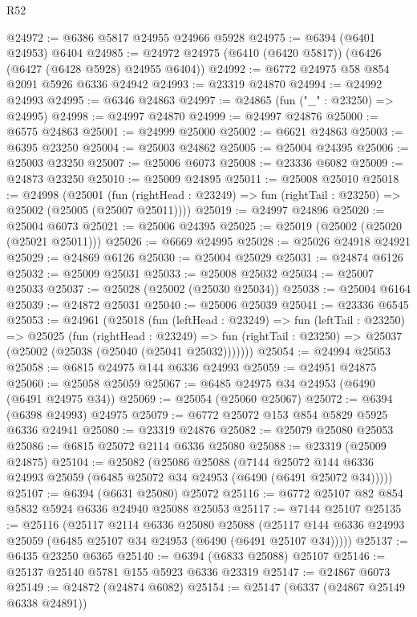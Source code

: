 \begin{lexlean}{R52}
\begin{coremodule}
@24972 := @6386 @5817 @24955 @24966 @5928
@24975 := @6394 (@6401 @24953) @6404
@24985 := @24972 @24975 (@6410 (@6420 @5817)) (@6426 (@6427 (@6428 @5928) @24955 @6404))
@24992 := @6772 @24975 @58 @854 @2091 @5926 @6336 @24942
@24993 := @23319 @24870
@24994 := @24992 @24993
@24995 := @6346 @24863
@24997 := @24865 (fun ("_" : @23250) => @24995)
@24998 := @24997 @24870
@24999 := @24997 @24876
@25000 := @6575 @24863
@25001 := @24999 @25000
@25002 := @6621 @24863
@25003 := @6395 @23250
@25004 := @25003 @24862
@25005 := @25004 @24395
@25006 := @25003 @23250
@25007 := @25006 @6073
@25008 := @23336 @6082
@25009 := @24873 @23250
@25010 := @25009 @24895
@25011 := @25008 @25010
@25018 := @24998
    (@25001
      (fun (rightHead : @23249) => fun (rightTail : @23250) => @25002 (@25005 (@25007 @25011))))
@25019 := @24997 @24896
@25020 := @25004 @6073
@25021 := @25006 @24395
@25025 := @25019 (@25002 (@25020 (@25021 @25011)))
@25026 := @6669 @24995
@25028 := @25026 @24918 @24921
@25029 := @24869 @6126
@25030 := @25004 @25029
@25031 := @24874 @6126
@25032 := @25009 @25031
@25033 := @25008 @25032
@25034 := @25007 @25033
@25037 := @25028 (@25002 (@25030 @25034))
@25038 := @25004 @6164
@25039 := @24872 @25031
@25040 := @25006 @25039
@25041 := @23336 @6545
@25053 := @24961
    (@25018
      (fun (leftHead : @23249) =>
      fun (leftTail : @23250) =>
      @25025
        (fun (rightHead : @23249) =>
        fun (rightTail : @23250) => @25037 (@25002 (@25038 (@25040 (@25041 @25032)))))))
@25054 := @24994 @25053
@25058 := @6815 @24975 @144 @6336 @24993
@25059 := @24951 @24875
@25060 := @25058 @25059
@25067 := @6485 @24975 @34 @24953 (@6490 (@6491 @24975 @34))
@25069 := @25054 (@25060 @25067)
@25072 := @6394 (@6398 @24993) @24975
@25079 := @6772 @25072 @153 @854 @5829 @5925 @6336 @24941
@25080 := @23319 @24876
@25082 := @25079 @25080 @25053
@25086 := @6815 @25072 @2114 @6336 @25080
@25088 := @23319 (@25009 @24875)
@25104 := @25082
    (@25086
      @25088
      (@7144 @25072 @144 @6336 @24993 @25059 (@6485 @25072 @34 @24953 (@6490 (@6491 @25072 @34)))))
@25107 := @6394 (@6631 @25080) @25072
@25116 := @6772 @25107 @82 @854 @5832 @5924 @6336 @24940 @25088 @25053
@25117 := @7144 @25107
@25135 := @25116
    (@25117
      @2114
      @6336
      @25080
      @25088
      (@25117 @144 @6336 @24993 @25059 (@6485 @25107 @34 @24953 (@6490 (@6491 @25107 @34)))))
@25137 := @6435 @23250 @6365
@25140 := @6394 (@6833 @25088) @25107
@25146 := @25137 @25140 @5781 @155 @5923 @6336 @23319
@25147 := @24867 @6073
@25149 := @24872 (@24874 @6082)
@25154 := @25147 (@6337 (@24867 @25149 @6338 @24891))

\end{coremodule}
\end{lexlean}

